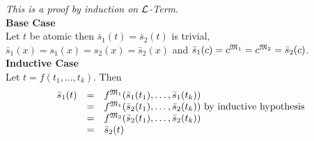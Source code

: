 \documentclass[11pt,a4paper]{article}
\begin{document}
\textit{This is a proof by induction on $\mathcal{L}$-Term}.\\
\textbf{Base Case}\\
Let $t$ be atomic then $\bar{s}_1(t)=\bar{s}_2(t)$ is trivial, $\bar{s}_1(x)=s_1(x)=s_2(x)=\bar{s}_2(x)$ and $\bar{s}_1(c)=c^{\mathfrak{M}_1}=c^{\mathfrak{M}_2}=\bar{s}_2(c)$.\\
\textbf{Inductive Case}\\
Let $t=f(t_1,\dots,t_k)$. Then
\[\begin{array}{rcl}
\bar{s}_1(t)&=&f^{\mathfrak{M}_1}(\bar{s}_1(t_1),\dots,\bar{s}_1(t_k))\\
&=&f^{\mathfrak{M}_1}(\bar{s}_2(t_1),\dots,\bar{s}_2(t_k))\text{ by inductive hypothesis}\\
&=&f^{\mathfrak{M}_2}(\bar{s}_2(t_1),\dots,\bar{s}_2(t_k))\\
&=&\bar{s}_2(t)
\end{array}\]\proved
\end{document}
